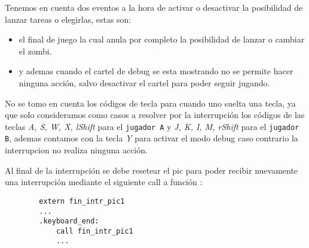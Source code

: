 	Tenemos en cuenta dos eventos a la hora de activar o desactivar la posibilidad de lanzar tareas o elegirlas, estas son: 
	\begin{itemize}
		\item{el final de juego la cual anula por completo la posibilidad de lanzar o cambiar el zombi.}

		\item{y ademas cuando el cartel de debug se esta mostrando no se permite hacer ninguna acción, salvo desactivar el cartel para poder seguir jugando.}
	\end{itemize}

	No se tomo en cuenta los códigos de tecla para cuando uno suelta una tecla, ya que solo consideramos como casos a resolver por la interrupción los códigos de las teclas \textit{A, S, W, X, lShift} para el \texttt{jugador A} y \textit{J, K, I, M, rShift} para el \texttt{jugador B}, ademas contamos con la tecla \textit{Y} para activar el modo debug caso contrario la interrupcion no realiza ninguna acción.

	Al final de la interrupción se debe resetear el pic para poder recibir nuevamente una interrupción mediante el siguiente call a función :

	\begin{lstlisting}
		extern fin_intr_pic1
		...
   		.keyboard_end:
    		call fin_intr_pic1
    		...	
	\end{lstlisting}
